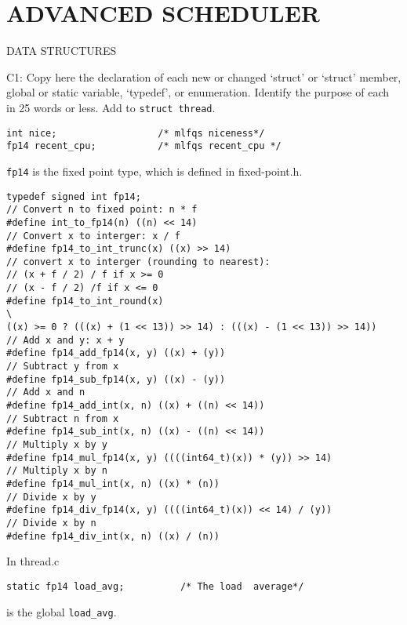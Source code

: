 \section{ADVANCED SCHEDULER}
\begin{aspect}{DATA STRUCTURES}
  \begin{qc}
    C1: Copy here the declaration of each new or changed `struct' or `struct' member, global or static variable, `typedef', or enumeration.  Identify the purpose of each in 25 words or less.
    Add to \lstinline{struct thread}.
  \end{qc}
  \begin{lstlisting}
int nice;                  /* mlfqs niceness*/
fp14 recent_cpu;           /* mlfqs recent_cpu */
    \end{lstlisting}
  \lstinline{fp14} is the fixed point type, which is defined in fixed-point.h.
  \begin{lstlisting}
typedef signed int fp14;
// Convert n to fixed point: n * f
#define int_to_fp14(n) ((n) << 14)
// Convert x to interger: x / f
#define fp14_to_int_trunc(x) ((x) >> 14)
// convert x to interger (rounding to nearest):
// (x + f / 2) / f if x >= 0
// (x - f / 2) /f if x <= 0
#define fp14_to_int_round(x)                                                  \
((x) >= 0 ? (((x) + (1 << 13)) >> 14) : (((x) - (1 << 13)) >> 14))
// Add x and y: x + y
#define fp14_add_fp14(x, y) ((x) + (y))
// Subtract y from x
#define fp14_sub_fp14(x, y) ((x) - (y))
// Add x and n
#define fp14_add_int(x, n) ((x) + ((n) << 14))
// Subtract n from x
#define fp14_sub_int(x, n) ((x) - ((n) << 14))
// Multiply x by y
#define fp14_mul_fp14(x, y) ((((int64_t)(x)) * (y)) >> 14)
// Multiply x by n
#define fp14_mul_int(x, n) ((x) * (n))
// Divide x by y
#define fp14_div_fp14(x, y) ((((int64_t)(x)) << 14) / (y))
// Divide x by n
#define fp14_div_int(x, n) ((x) / (n))
  \end{lstlisting}
  In thread.c
  \begin{lstlisting}
static fp14 load_avg;          /* The load  average*/
  \end{lstlisting}
  is the global \lstinline{load_avg}.
\end{aspect}
